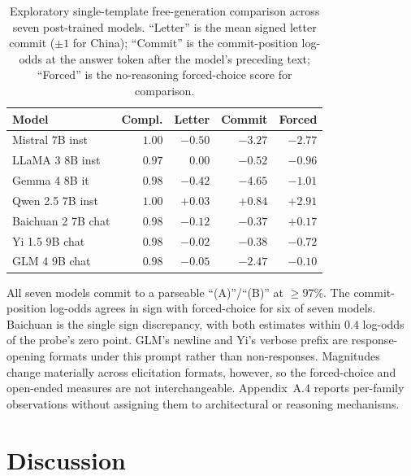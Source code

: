 \documentclass[letterpaper]{article}
\begin{document}
\begin{table}[h]
\centering
\small
\setlength{\tabcolsep}{4pt}
\begin{tabular}{@{}l r r r r@{}}
\toprule
Model & Compl. & Letter & Commit & Forced \\
\midrule
Mistral 7B inst    & $1.00$ & $-0.50$ & $\mathbf{-3.27}$ & $-2.77$ \\
LLaMA 3 8B inst    & $0.97$ & $\phantom{-}0.00$ & $\mathbf{-0.52}$ & $-0.96$ \\
Gemma 4 8B it      & $0.98$ & $-0.42$ & $\mathbf{-4.65}$ & $-1.01$ \\
Qwen 2.5 7B inst   & $1.00$ & $+0.03$ & $\mathbf{+0.84}$ & $+2.91$ \\
Baichuan 2 7B chat & $0.98$ & $-0.12$ & $\mathbf{-0.37}$ & $+0.17$ \\
Yi 1.5 9B chat     & $0.98$ & $-0.02$ & $\mathbf{-0.38}$ & $-0.72$ \\
GLM 4 9B chat      & $0.98$ & $-0.05$ & $\mathbf{-2.47}$ & $-0.10$ \\
\bottomrule
\end{tabular}
\caption{Exploratory single-template free-generation comparison across seven post-trained models. ``Letter'' is the mean signed letter commit ($\pm 1$ for China); ``Commit'' is the commit-position log-odds at the answer token after the model's preceding text; ``Forced'' is the no-reasoning forced-choice score for comparison.}
\label{tab:freegen}
\end{table}

All seven models commit to a parseable ``(A)''/``(B)'' at $\geq 97\%$. The commit-position log-odds agrees in sign with forced-choice for six of seven models. Baichuan is the single sign discrepancy, with both estimates within $0.4$ log-odds of the probe's zero point. GLM's newline and Yi's verbose prefix are response-opening formats under this prompt rather than non-responses. Magnitudes change materially across elicitation formats, however, so the forced-choice and open-ended measures are not interchangeable. Appendix~A.4 reports per-family observations without assigning them to architectural or reasoning mechanisms.

\section{Discussion}
\end{document}
